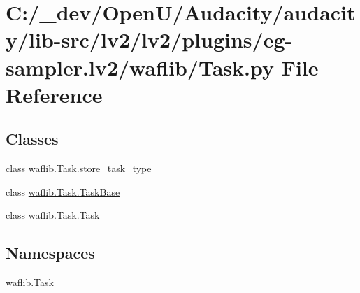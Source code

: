 \hypertarget{lv2_2plugins_2eg-sampler_8lv2_2waflib_2_task_8py}{}\section{C\+:/\+\_\+dev/\+Open\+U/\+Audacity/audacity/lib-\/src/lv2/lv2/plugins/eg-\/sampler.lv2/waflib/\+Task.py File Reference}
\label{lv2_2plugins_2eg-sampler_8lv2_2waflib_2_task_8py}
\subsection*{Classes}
\begin{DoxyCompactItemize}
\item 
class \hyperlink{classwaflib_1_1_task_1_1store__task__type}{waflib.\+Task.\+store\+\_\+task\+\_\+type}
\item 
class \hyperlink{classwaflib_1_1_task_1_1_task_base}{waflib.\+Task.\+Task\+Base}
\item 
class \hyperlink{classwaflib_1_1_task_1_1_task}{waflib.\+Task.\+Task}
\end{DoxyCompactItemize}
\subsection*{Namespaces}
\begin{DoxyCompactItemize}
\item 
 \hyperlink{namespacewaflib_1_1_task}{waflib.\+Task}
\end{DoxyCompactItemize}
